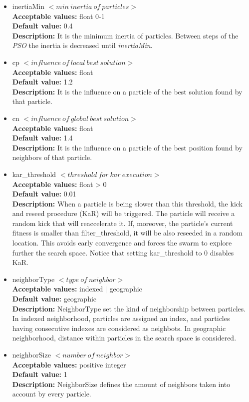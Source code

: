 \documentclass[a4paper, 12pt]{article}
\begin{document}
\begin{itemize}
\item inertiaMin $< min\ inertia\ of\ particles >$\\
\textbf{Acceptable values:} float 0-1\\
\textbf{Default value:} 0.4\\
\textbf{Description:} It is the minimum inertia of particles. Between steps of the \emph{PSO} the inertia is decreased until \emph{inertiaMin}.

\item cp $< influence\ of\ local\ best\ solution >$ \\
\textbf{Acceptable values:} float\\
\textbf{Default value:} 1.2\\
\textbf{Description:} It is the influence on a particle of the best solution found by that particle. 

\item cn $< influence\ of\ global\ best\ solution >$\\
\textbf{Acceptable values:} float\\
\textbf{Default value:} 1.4\\
\textbf{Description:} It is the influence on a particle of the best position found by neighbors of that particle. 

\item kar\_threshold $< threshold\ for\ kar\ execution >$\\
\textbf{Acceptable values:} float > 0\\
\textbf{Default value:} 0.01\\
\textbf{Description:} When a particle is being slower than this threshold, the kick and reseed procedure (KaR) will be triggered. The particle will receive a random kick that will reaccelerate it. If, moreover, the particle's current fitness is smaller than filter\_threshold, it will be also reseeded in a random location. This avoids early convergence and forces the swarm to explore further the search space. Notice that setting kar\_threshold to 0 disables KaR.

\item neighborType $< type\ of\ neighbor>$\\
\textbf{Acceptable values:} indexed $|$ geographic\\
\textbf{Default value:} geographic\\
\textbf{Description:} NeighborType set the kind of neighborship between particles. In indexed neighborhood, particles are assigned an index, and particles having consecutive indexes are considered as neighbots. In geographic neighborhood, distance within particles in the search space is considered.

\item neighborSize $< number\ of\ neighbor>$\\
\textbf{Acceptable values:} positive integer\\
\textbf{Default value:} 1\\
\textbf{Description:} NeighborSize defines the amount of neighbors taken into account by every particle.
\end{itemize}
\end{document}

